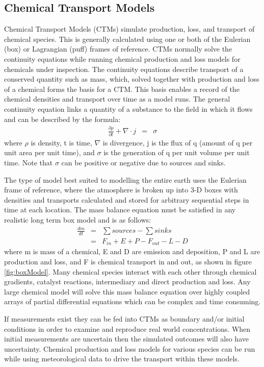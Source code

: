 \subsection{Chemical Transport Models}
Chemical Transport Models (CTMs) simulate production, loss, and transport of chemical species.
This is generally calculated using one or both of the Eulerian (box) or Lagrangian (puff) frames of reference.
CTMs normally solve the continuity equations while running chemical production and loss models for chemicals under inspection. 
The continuity equations describe transport of a conserved quantity such as mass, which, solved together with production and loss of a chemical forms the basis for a CTM.
This basis enables a record of the chemical densities and transport over time as a model runs.
The general continuity equation links a quantity of a substance to the field in which it flows and can be described by the formula:
\begin{eqnarray*}
    \frac{\partial \rho}{\partial t} + \nabla \cdot j &=& \sigma 
\end{eqnarray*}
where $\rho$ is density, t is time, $\nabla$ is divergence, j is the flux of q (amount of q per unit area per unit time), and $\sigma$ is the generation of q per unit volume per unit time.
Note that $\sigma$ can be positive or negative due to sources and sinks.

The type of model best suited to modelling the entire earth uses the Eulerian frame of reference, where the atmosphere is broken up into 3-D boxes with densities and transports calculated and stored for arbitrary sequential steps in time at each location.
The mass balance equation must be satisfied in any realistic long term box model and is as follows: 
\begin{eqnarray*}
    \frac{dm}{dt} &=& \sum{sources}-\sum{sinks} \\
    &=& F_{in} + E + P - F_{out} - L - D 
\end{eqnarray*}
where m is mass of a chemical, E and D are emission and deposition, P and L are production and loss, and F is chemical transport in and out, as shown in figure \ref{fig:boxModel}.
Many chemical species interact with each other through chemical gradients, catalyst reactions, intermediary and direct production and loss. 
Any large chemical model will solve this mass balance equation over highly coupled arrays of partial differential equations which can be complex and time consuming.

If measurements exist they can be fed into CTMs as boundary and/or initial conditions in order to examine and reproduce real world concentrations.
When initial measurements are uncertain then the simulated outcomes will also have uncertainty.
Chemical production and loss models for various species can be run while using meteorological data to drive the transport within these models.

